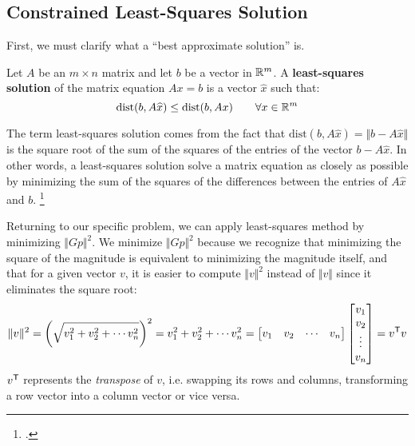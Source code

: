 \subsection{Constrained Least-Squares Solution} \label{sec:clss}

First, we must clarify what a ``best approximate solution'' is. 
\begin{definition}
    Let $A$ be an $m \times n$ matrix and let $b$ be a vector in $\mathbb{R}^m$. A \textbf{least-squares solution} of the matrix equation $Ax = b$ is a vector $\widehat{x}$ such that:
    \begin{equation*}
        \mathrm{dist}(b, A\widehat{x}) \leq \mathrm{dist}(b, Ax) \qquad \forall x \in \mathbb{R}^m
    \end{equation*}
\end{definition}

The term least-squares solution comes from the fact that $\mathrm{dist}(b, A\widehat{x})= \Vert b - A\widehat{x} \Vert$ is the square root of the sum of the squares of the entries of the vector $b - A\widehat{x}$. In other words, a least-squares solution solve a matrix equation as closely as possible by minimizing the sum of the squares of the differences between the entries of $A\widehat{x}$ and $b$. \footcite{margalitMethodLeast}

Returning to our specific problem, we can apply least-squares method by minimizing $\Vert Gp \Vert^2$. We minimize $\Vert Gp \Vert^2$ because we recognize that minimizing the square of the magnitude is equivalent to minimizing the magnitude itself, and that for a given vector $v$, it is easier to compute $\Vert v \Vert^2$ instead of $\Vert v \Vert$ since it eliminates the square root:
\begin{equation*}
    \Vert v \Vert^2
     = \left(\sqrt{v_1^2+v_2^2+ \cdots v_n^2}\right)^2 
     = v_1^2+v_2^2+ \cdots v_n^2 
     = \begin{bmatrix}
        v_1 & v_2 & \cdots & v_n
    \end{bmatrix}
    \begin{bmatrix}
        v_1 \\ v_2 \\ \vdots \\ v_n
    \end{bmatrix} 
     = v^{\mathsf{T}} v
\end{equation*}
$v^{\mathsf{T}}$ represents the \emph{transpose} of $v$, i.e. swapping its rows and columns, transforming a row vector into a column vector or vice versa.

